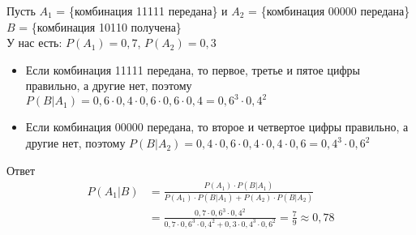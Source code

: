 \begin{exercise}[10]
	Пусть $A_1$ = \{комбинация 11111 передана\} и $A_2$ = \{комбинация 00000 передана\} \\ $B$ = \{комбинация 10110 получена\} \\ У нас есть: $P(A_1) = 0,7$, $P(A_2) = 0,3$
	\begin{itemize}
		\item Если комбинация 11111 передана, то первое, третье и пятое цифры правильно, а другие нет, поэтому $P(B | A_1) = 0,6 \cdot 0,4 \cdot 0,6 \cdot 0,6 \cdot 0,4 = 0,6^3 \cdot 0,4^2$
		\item Если комбинация 00000 передана, то второе и четвертое цифры правильно, а другие нет, поэтому $P(B | A_2) = 0,4 \cdot 0,6 \cdot 0,4 \cdot 0,4 \cdot 0,6 = 0,4^3 \cdot 0,6^2$
	\end{itemize}
	Ответ
	\begin{align*}
		P(A_1 | B) & = \frac{P(A_1) \cdot P(B | A_1)}{P(A_1) \cdot P(B | A_1) + P(A_2) \cdot P(B | A_2)} \\ & = \frac{0,7 \cdot 0,6^3 \cdot 0,4^2}{0,7 \cdot 0,6^3 \cdot 0,4^2 + 0,3 \cdot 0,4^3 \cdot 0,6^2} = \frac{7}{9} \approx 0,78
	\end{align*}
\end{exercise}